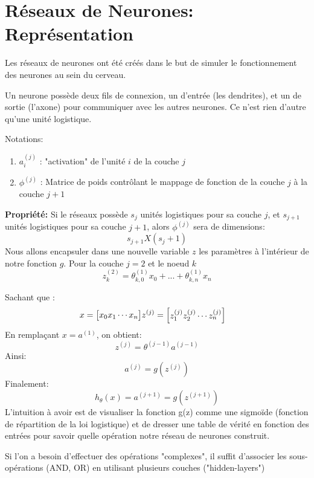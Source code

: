 \documentclass{article}
\theoremstyle{definition}
\begin{document}
\section{Réseaux de Neurones: Représentation}
Les réseaux de neurones ont été créés dans le but de simuler le fonctionnement des neurones au sein du cerveau. \par
 Un neurone possède deux fils de connexion, un d'entrée (les dendrites), et un de sortie (l'axone) pour communiquer avec les autres neurones. Ce n'est rien d'autre qu'une unité logistique. \par
Notations:
\begin{enumerate}
\item $a_i^{(j)}$ : "activation" de l'unité $i$ de la couche $j$
\item $\phi^{(j)}$ : Matrice de poids contrôlant le mappage de fonction de la couche $j$ à la couche $j+1$
\end{enumerate}
 \textbf{Propriété:} Si le réseaux possède $s_j$ unités logistiques pour sa couche $j$, et $s_{j+1}$ unités logistiques pour sa couche $j+1$, alors $\phi^{(j)}$ sera de dimensions: $$s_{j+1} X (s_j + 1)$$
Nous allons encapsuler dans une nouvelle variable $z$ les paramètres à l'intérieur de notre fonction $g$. Pour la couche $j=2$ et le noeud $k$
$$z_k^{(2)} = \theta_{k,0}^{(1)}x_0+...+\theta_{k,n}^{(1)}x_n$$
\par Sachant que : 
\begin{align*}x = \begin{bmatrix}x_0 \newline x_1 \newline\cdots \newline x_n\end{bmatrix} &z^{(j)} = \begin{bmatrix}z_1^{(j)} \newline z_2^{(j)} \newline\cdots \newline z_n^{(j)}\end{bmatrix}
\end{align*}
En remplaçant $x=a^{(1)}$, on obtient:
$$z^{(j)} = \theta^{(j-1)}a^{(j-1)}$$
Ainsi:
$$a^{(j)}=g(z^{(j)})$$
Finalement:
$$h_\theta(x) = a^{(j+1)} = g(z^{(j+1)})$$
L'intuition à avoir est de visualiser la fonction g(z) comme une sigmoïde (fonction de répartition de la loi logistique) et de dresser une table de vérité en fonction des entrées pour savoir quelle opération notre réseau de neurones construit.
\par Si l'on a besoin d'effectuer des opérations "complexes", il suffit d'associer les sous-opérations (AND, OR) en utilisant plusieurs couches ("hidden-layers")
\end{document}
